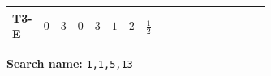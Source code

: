 \documentclass[8pt]{article}
\begin{document}
\begin{landscape}
\begin{longtable}{@{}llcccccc >{\raggedright\arraybackslash}p{0.21\linewidth} >{\raggedright\arraybackslash}p{0.21\linewidth} >{\raggedright\arraybackslash}p{0.21\linewidth}@{}}
\midrule
T3-E & $0$ & $3$ & $0$ & $3$ & $1$ & $2$ & $\frac{1}{2}$ & \scriptsize\adjustbox{max width=\linewidth}{$\begin{gathered} - \frac{11 \sqrt{3} g_{2}^{2} \overline{y_{1}} \overline{y_{2}}}{8 MF}\end{gathered}$} & \scriptsize\adjustbox{max width=\linewidth}{$\begin{gathered} - \frac{3 \sqrt{11} lambda12Inv2 \overline{y_{1}} \overline{y_{2}}}{22 MF}\end{gathered}$} & \scriptsize\adjustbox{max width=\linewidth}{$\begin{gathered} - \frac{\sqrt{3} g_{1}^{2} \overline{y_{1}} \overline{y_{2}}}{8 MF}\end{gathered}$} \\
\midrule
\bottomrule
\end{longtable}
\clearpage
\noindent\textbf{Search name: }\texttt{1,1,5,13}\par\smallskip

\end{landscape}
\end{document}
